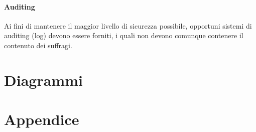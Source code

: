 \documentclass{report}
\begin{document}
\subsubsection{Auditing}
Ai fini di mantenere il maggior livello di sicurezza possibile, opportuni sistemi di auditing (log) devono essere forniti, i quali non devono comunque contenere il contenuto dei suffragi.






\chapter{Diagrammi}








\chapter{Appendice}
\end{document}
